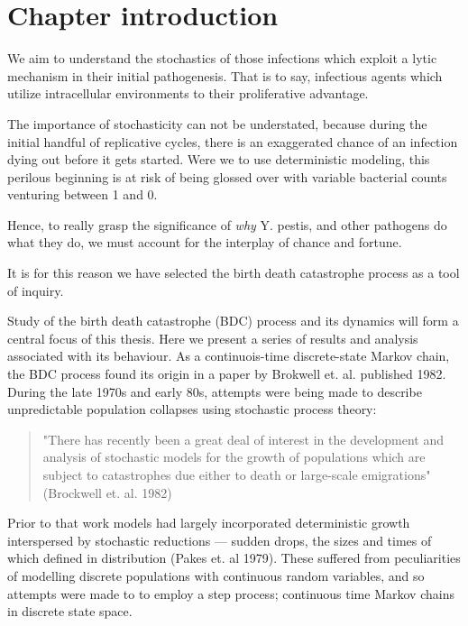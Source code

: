 \section{Chapter introduction}



We aim to understand the stochastics of those infections which exploit a lytic mechanism in their initial pathogenesis. That is to say, infectious agents which utilize intracellular environments to their proliferative advantage.\par

The importance of stochasticity can not be understated, because during the initial handful of replicative cycles, there is an exaggerated 
chance of an infection dying out before it gets started. Were we to use deterministic modeling, this perilous beginning is at risk of being glossed over with variable bacterial counts venturing between 1 and 0. \par

Hence, to really grasp the significance of \textit{why} Y. pestis, and other pathogens do what they do, we must account for the interplay of chance and fortune. 

It is for this reason we have selected the birth death catastrophe process as a tool of inquiry. \par
\vspace{25pt}




\noindent
Study of the birth death catastrophe (BDC) process and its dynamics will form a central focus of this thesis. Here
we present a series of results and analysis associated with its behaviour. As a continuois-time discrete-state Markov chain, 
the BDC process found its origin in a paper by Brokwell et. al. published 1982. During the late 1970s and early 80s,
attempts were being made to describe unpredictable population collapses using stochastic process theory:
\begin{quotation}
    "There has recently been a great deal of interest in the development and
    analysis of stochastic models for the growth of populations which are subject to
    catastrophes due either to death or large-scale emigrations" (Brockwell et. al. 1982)
\end{quotation}
Prior to that work models had largely incorporated deterministic growth interspersed by stochastic reductions --- sudden
drops, the sizes and times of which defined in distribution (Pakes et. al 1979). These suffered from peculiarities of 
modelling discrete populations with continuous random variables, and so attempts were made to to employ a step process; 
continuous time Markov chains in discrete state space.\par

